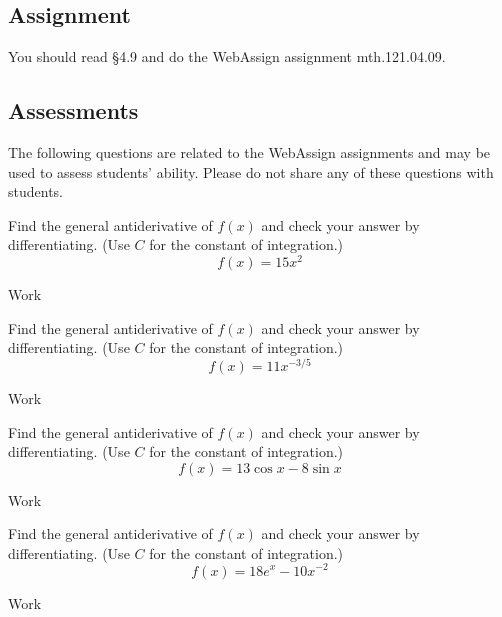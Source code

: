\documentclass[12pt,addpoints, answers, fleqn]{exam}
\begin{document}
\subsection{Assignment}
You should read \S  4.9 and do the WebAssign assignment mth.121.04.09.
\vfill
\pagebreak
\begin{teacher}
\subsection{Assessments}
The following questions are related to the WebAssign assignments and may be used to assess students' ability. Please do not share any of these questions with students.
\begin{questions}		
\question 	%

Find the general antiderivative of $f\left(x\right)$ and check your answer by differentiating. (Use $C$ for the constant of integration.)
\[
f\left(x\right) = 15x^2
\]
\begin{solution}
Work
\end{solution}

\question 	%

Find the general antiderivative of $f\left(x\right)$ and check your answer by differentiating. (Use $C$ for the constant of integration.)
\[
f\left(x\right) = 11x^{-3/5}
\]
\begin{solution}
Work
\end{solution}

\question 	%

Find the general antiderivative of $f\left(x\right)$ and check your answer by differentiating. (Use $C$ for the constant of integration.)
\[
f\left(x\right) = 13 \cos x - 8 \sin x
\]
\begin{solution}
Work
\end{solution}


\question 	%

Find the general antiderivative of $f\left(x\right)$ and check your answer by differentiating. (Use $C$ for the constant of integration.)
\[
f\left(x\right) = 18 e^x - 10 x^{-2}
\]
\begin{solution}
Work
\end{solution}

\question 	%


\end{questions}
\end{teacher}
\end{document}
